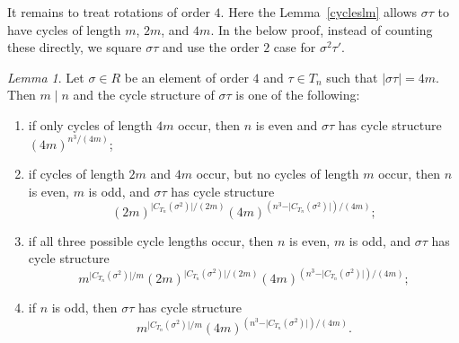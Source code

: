 \documentclass[12pt]{article}
\theoremstyle{definition}
\theoremstyle{remark}
\newtheorem{lemma}[theorem]{Lemma}
\begin{document}
It remains to treat rotations of order $4$.
Here the Lemma~\ref{cycleslm} allows $\sigma\tau$ to have cycles of length $m$, $2m$, and $4m$.
In the below proof, instead of counting these directly, we square $\sigma\tau$ and use the order $2$ case for $\sigma^2\tau'$.

\begin{lemma}\label{lem:cyclestructfour}
    Let $\sigma\in R$ be an element of order $4$ and $\tau \in T_n$ such that $\vert \sigma\tau\vert =4m.$
Then $m\mid n$ and the cycle structure of $\sigma\tau$ is one of the following:
\begin{enumerate}
\item if only cycles of length $4m$ occur, then $n$ is even and $\sigma\tau$ has cycle structure $(4m)^{n^3/(4m)}$;
\item if cycles of length $2m$ and $4m$ occur, but no cycles of length $m$ occur, then $n$ is even, $m$ is odd, and $\sigma\tau$ has cycle structure
\[
(2m)^{\vert C_{T_n}(\sigma^2) \vert/(2m)}
(4m)^{(n^3-\vert C_{T_n}(\sigma^2)\vert )/(4m)} ;
\]
\item if all three possible cycle lengths occur, then $n$ is even, $m$ is odd, and $\sigma\tau$ has cycle structure
\[
m^{\vert C_{T_n}(\sigma^2) \vert/m}
(2m)^{\vert C_{T_n}(\sigma^2) \vert/(2m)}
(4m)^{(n^3-\vert C_{T_n}(\sigma^2)\vert )/(4m)} ;
\]
\item if $n$ is odd, then $\sigma\tau$ has cycle structure
\[
m^{\vert C_{T_n}(\sigma^2) \vert/m}
(4m)^{(n^3-\vert C_{T_n}(\sigma^2)\vert )/(4m)} .
\]


\end{enumerate}
\end{lemma}
\end{document}
